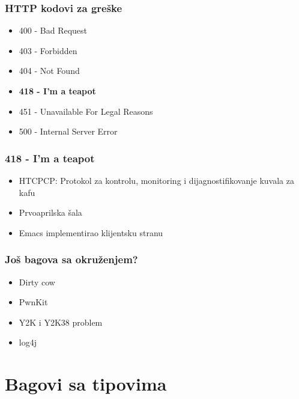 \documentclass{beamer}
\begin{document}
\begin{frame}
    \frametitle{HTTP kodovi za greške}
    \begin{itemize}
        \item 400 - Bad Request \newline
        \item 403 - Forbidden \newline
        \item 404 - Not Found \newline
        \item \textbf{418 - I'm a teapot} \newline
        \item 451 - Unavailable For Legal Reasons \newline
        \item 500 - Internal Server Error \newline 
    \end{itemize}
\end{frame}

\begin{frame}
    \frametitle{418 - I'm a teapot}
    \begin{itemize}
        \item HTCPCP: Protokol za kontrolu, monitoring i dijagnostifikovanje kuvala za kafu \newline
        \item Prvoaprilska šala \newline
        \item Emacs implementirao klijentsku stranu \newline
    \end{itemize}
\end{frame}

\begin{frame}
    \frametitle{Još bagova sa okruženjem?}
    \begin{itemize}
        \item Dirty cow \newline
        \item PwnKit \newline
        \item Y2K i Y2K38 problem \newline
        \item log4j \newline
    \end{itemize}
\end{frame}

\section{Bagovi sa tipovima}
\end{document}
